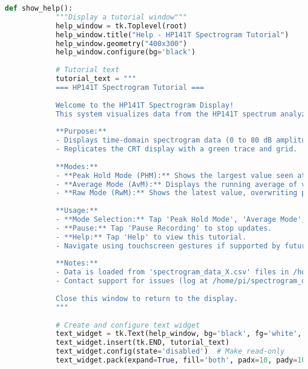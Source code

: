 \documentclass[class=report,11pt,crop=false]{standalone}
\begin{document}
	\begin{lstlisting}[language=Python, caption={Code snippet for creating a pop-up window with a tutorial when the user interacts with the \texttt{HELP} button.}, label={lst:guis-show-help}]
		def show_help():
			"""Display a tutorial window"""
			help_window = tk.Toplevel(root)
			help_window.title("Help - HP141T Spectrogram Tutorial")
			help_window.geometry("400x300")
			help_window.configure(bg='black')
			
			# Tutorial text
			tutorial_text = """
			=== HP141T Spectrogram Tutorial ===
			
			Welcome to the HP141T Spectrogram Display!
			This system visualizes data from the HP141T spectrum analyzer on a touchscreen LCD.
			
			**Purpose:**
			- Displays time-domain spectrogram data (0 to 80 dB amplitude, time sweep).
			- Replicates the CRT display with a green trace and grid.
			
			**Modes:**
			- **Peak Hold Mode (PHM):** Shows the largest value seen at each time point, updated per scan.
			- **Average Mode (AvM):** Displays the running average of values at each time point, updated per scan.
			- **Raw Mode (RwM):** Shows the latest value, overwriting previous data during each scan.
			
			**Usage:**
			- **Mode Selection:** Tap 'Peak Hold Mode', 'Average Mode', or 'Raw Mode' to switch display modes.
			- **Pause:** Tap 'Pause Recording' to stop updates.
			- **Help:** Tap 'Help' to view this tutorial.
			- Navigate using touchscreen gestures if supported by future updates.
			
			**Notes:**
			- Data is loaded from 'spectrogram_data_X.csv' files in /home/pi.
			- Contact support for issues (log at /home/pi/spectrogram_display.log).
			
			Close this window to return to the display.
			"""
			
			# Create and configure text widget
			text_widget = tk.Text(help_window, bg='black', fg='white', font=('Courier', 10), wrap='word')
			text_widget.insert(tk.END, tutorial_text)
			text_widget.config(state='disabled')  # Make read-only
			text_widget.pack(expand=True, fill='both', padx=10, pady=10)
	\end{lstlisting} 
	\ifstandalone
	
	\printnoidxglossary[type=\acronymtype,nonumberlist]
	\fi
\end{document}
